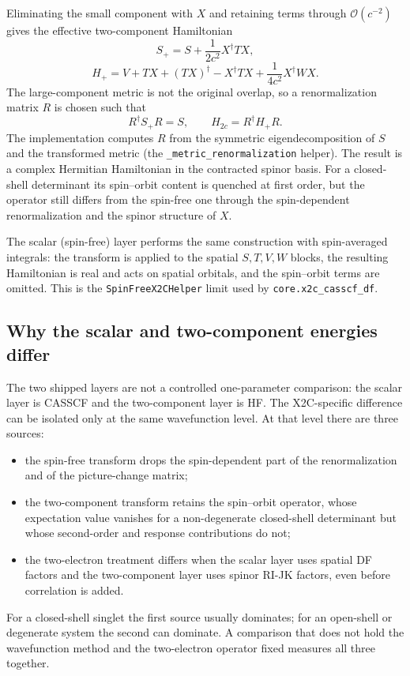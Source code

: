 Eliminating the small component with $X$ and retaining terms through
$\mathcal{O}(c^{-2})$ gives the effective two-component Hamiltonian
\begin{equation}
  S_{+} = S + \frac{1}{2c^{2}}X^{\dagger}TX,
  \label{eq:x2c-splus}
\end{equation}
\begin{equation}
  H_{+} = V + TX + (TX)^{\dagger} - X^{\dagger}TX
        + \frac{1}{4c^{2}}X^{\dagger}WX.
  \label{eq:x2c-hplus}
\end{equation}
The large-component metric is not the original overlap, so a
renormalization matrix $R$ is chosen such that
\begin{equation}
  R^{\dagger}S_{+}R = S,
  \qquad
  H_{2c} = R^{\dagger}H_{+}R.
  \label{eq:x2c-renorm}
\end{equation}
The implementation computes $R$ from the symmetric eigendecomposition
of $S$ and the transformed metric (the \texttt{\_metric\_renormalization}
helper).  The result is a complex Hermitian Hamiltonian in the
contracted spinor basis.  For a closed-shell determinant its
spin--orbit content is quenched at first order, but the operator still
differs from the spin-free one through the spin-dependent
renormalization and the spinor structure of $X$.

The scalar (spin-free) layer performs the same construction with
spin-averaged integrals: the transform is applied to the spatial
$S,T,V,W$ blocks, the resulting Hamiltonian is real and acts on spatial
orbitals, and the spin--orbit terms are omitted.  This is the
\texttt{SpinFreeX2CHelper} limit used by
\texttt{core.x2c\_casscf\_df}.

\subsection{Why the scalar and two-component energies differ}

The two shipped layers are not a controlled one-parameter comparison:
the scalar layer is CASSCF and the two-component layer is HF.  The
X2C-specific difference can be isolated only at the same wavefunction
level.  At that level there are three sources:

\begin{itemize}
\item the spin-free transform drops the spin-dependent part of the
  renormalization and of the picture-change matrix;
\item the two-component transform retains the spin--orbit operator,
  whose expectation value vanishes for a non-degenerate closed-shell
  determinant but whose second-order and response contributions do not;
\item the two-electron treatment differs when the scalar layer uses
  spatial DF factors and the two-component layer uses spinor RI-JK
  factors, even before correlation is added.
\end{itemize}
For a closed-shell singlet the first source usually dominates; for an
open-shell or degenerate system the second can dominate.  A comparison
that does not hold the wavefunction method and the two-electron
operator fixed measures all three together.

